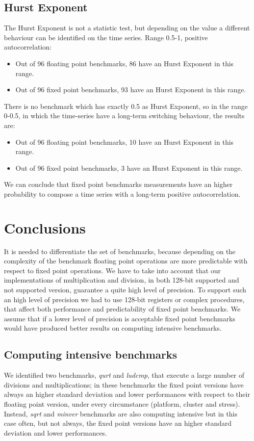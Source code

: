 \subsection{Hurst Exponent}
The Hurst Exponent is not a statistic test, but depending on the value a different behaviour can be identified on the time series.\newline
Range 0.5-1, positive autocorrelation:
\begin{itemize}
	\item Out of 96 floating point benchmarks, 86 have an Hurst Exponent in this range.
	\item Out of 96 fixed point benchmarks, 93 have an Hurst Exponent in this range.
\end{itemize}
There is no benchmark which has exactly 0.5 as Hurst Exponent, so in the range 0-0.5, in which the time-series have a long-term switching behaviour, the results are:
\begin{itemize}
	\item Out of 96 floating point benchmarks, 10 have an Hurst Exponent in this range.
	\item Out of 96 fixed point benchmarks, 3 have an Hurst Exponent in this range.
\end{itemize}
We can conclude that fixed point benchmarks measurements have an higher probability to compose a time series with a long-term positive autocorrelation.
\clearpage
\section{Conclusions}
It is needed to differentiate the set of benchmarks, because depending on the complexity of the benchmark floating point operations are more predictable with respect to fixed point operations.\newline
We have to take into account that our implementations of multiplication and division, in both 128-bit supported and not supported version, guarantee a quite high level of precision.
To support such an high level of precision we had to use 128-bit registers or complex procedures, that affect both performance and predictability of fixed point benchmarks. We assume that if a lower level of precision is acceptable fixed point benchmarks would have produced better results on computing intensive benchmarks.
 
\subsection{Computing intensive benchmarks}
We identified two benchmarks, \textit{qurt} and \textit{ludcmp}, that execute a large number of divisions and multiplications; in these benchmarks the fixed point versions have always an higher standard deviation and lower performances with respect to their floating point version, under every circumstance (platform, cluster and stress).
Instead, \textit{sqrt} and \textit{minver} benchmarks are also computing intensive but in this case often, but not always, the fixed point versions have an higher standard deviation and lower performances.

